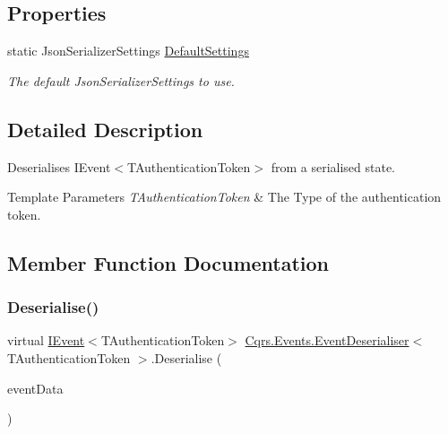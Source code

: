 \subsection*{Properties}
\begin{DoxyCompactItemize}
\item 
static Json\+Serializer\+Settings \hyperlink{classCqrs_1_1Events_1_1EventDeserialiser_a08bd067ca7ce8c28c7a83d444b7e468b_a08bd067ca7ce8c28c7a83d444b7e468b}{Default\+Settings}
\begin{DoxyCompactList}\small\item\em The default Json\+Serializer\+Settings to use. \end{DoxyCompactList}\end{DoxyCompactItemize}


\subsection{Detailed Description}
Deserialises I\+Event$<$\+T\+Authentication\+Token$>$ from a serialised state. 


\begin{DoxyTemplParams}{Template Parameters}
{\em T\+Authentication\+Token} & The Type of the authentication token.\\
\hline
\end{DoxyTemplParams}


\subsection{Member Function Documentation}
\mbox{\label{classCqrs_1_1Events_1_1EventDeserialiser_a193feac1d58446f0a7447d8ba04179fc_a193feac1d58446f0a7447d8ba04179fc}} 
\subsubsection{\texorpdfstring{Deserialise()}{Deserialise()}}
{\footnotesize\ttfamily virtual \hyperlink{interfaceCqrs_1_1Events_1_1IEvent}{I\+Event}$<$T\+Authentication\+Token$>$ \hyperlink{classCqrs_1_1Events_1_1EventDeserialiser}{Cqrs.\+Events.\+Event\+Deserialiser}$<$ T\+Authentication\+Token $>$.Deserialise (\begin{DoxyParamCaption}\item[{\hyperlink{classCqrs_1_1Events_1_1EventData}{Event\+Data}}]{event\+Data }\end{DoxyParamCaption})\hspace{0.3cm}{\ttfamily [virtual]}}



